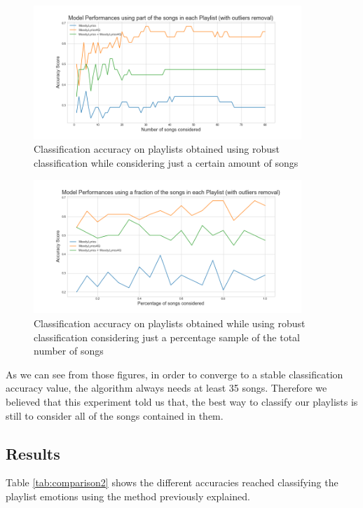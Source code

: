 \begin{figure}[H]
\centering
\includegraphics[width=0.9\textwidth]{./chapters/chapter5/images/subset-absolute-robust}
\caption{Classification accuracy on playlists obtained using robust classification while considering just a certain amount of songs}
\label{fig:subset-absolute-robust}
\end{figure}

\begin{figure}[H]
\centering
\includegraphics[width=0.9\textwidth]{./chapters/chapter5/images/subset-percentage-robust}
\caption{Classification accuracy on playlists obtained while using robust classification considering just a percentage sample of the total number of songs}
\label{fig:subset-percentage-robust}
\end{figure}

As we can see from those figures, in order to converge to a stable classification accuracy value, the algorithm always needs at least 35 songs. Therefore we believed that this experiment told us that, the best way to classify our playlists is still to consider all of the songs contained in them.

\subsection{Results}
Table \ref{tab:comparison2} shows the different accuracies reached classifying the playlist emotions using the method previously explained. 

